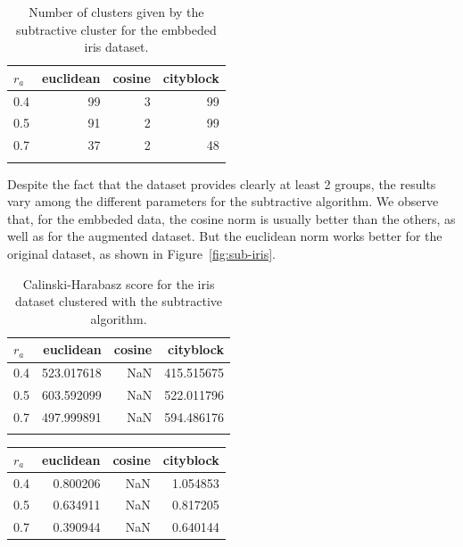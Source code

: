 \documentclass[conference]{IEEEtran}
\begin{document}
\begin{itemize}
    \begin{table}[ht!]
        \centering
        \begin{tabular}{lrrr}
        \toprule
        $r_a$ &  euclidean &  cosine &  cityblock \\
        \midrule
        0.4 &         99 &       3 &         99 \\
        0.5 &         91 &       2 &         99 \\
        0.7 &         37 &       2 &         48 \\
        \bottomrule \\
        \end{tabular}
        \caption{Number of clusters given by the subtractive cluster for the embbeded iris dataset.}
        \label{tab:ie_n_s}
    \end{table}
    Despite the fact that the dataset provides clearly at least 2 groups, the results vary among the different parameters for the subtractive algorithm. We observe that, for the embbeded data, the cosine norm is usually better than the others, as well as for the augmented dataset. But the euclidean norm works better for the original dataset, as shown in Figure~\ref{fig:sub-iris}.
    \begin{table}[ht!]
        \centering
        \begin{tabular}{lrrr}
        \toprule
        $r_a$ &   euclidean &  cosine &   cityblock \\
        \midrule
        0.4 &  523.017618 &     NaN &  415.515675 \\
        0.5 &  603.592099 &     NaN &  522.011796 \\
        0.7 &  497.999891 &     NaN &  594.486176 \\
        \bottomrule \\
        \end{tabular}
        \caption{Calinski-Harabasz score for the iris dataset clustered with the subtractive algorithm.}
        \label{tab:i1_ch}
    \end{table}
    \begin{table}[ht!]
        \centering
        \begin{tabular}{lrrr}
        \toprule
        $r_a$ &  euclidean &  cosine &  cityblock \\
        \midrule
        0.4 &   0.800206 &     NaN &   1.054853 \\
        0.5 &   0.634911 &     NaN &   0.817205 \\
        0.7 &   0.390944 &     NaN &   0.640144 \\

\end{tabular}
\end{table}
\end{itemize}
\end{document}
